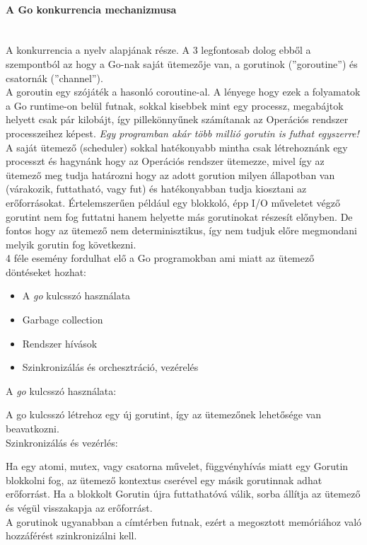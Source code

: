 \paragraph{A Go konkurrencia mechanizmusa} \mbox{} \\
A konkurrencia a nyelv alapjának része. A 3 legfontosab dolog ebből a szempontból az hogy a Go-nak saját ütemezője van,
a gorutinok (''goroutine'') és csatornák (''channel'').\\
A goroutin egy szójáték a hasonló coroutine-al. A lényege hogy ezek a folyamatok a Go runtime-on belül futnak, sokkal kisebbek mint egy processz, megabájtok helyett csak pár kilobájt,
így pillekönnyűnek számítanak az Operációs rendszer processzeihez képest. \emph{Egy programban akár több millió gorutin is futhat egyszerre!}
A saját ütemező (scheduler) sokkal hatékonyabb mintha csak létrehoznánk egy processzt és hagynánk hogy az Operációs rendszer ütemezze,
mivel így az ütemező meg tudja határozni hogy az adott gorution milyen állapotban van (várakozik, futtatható, vagy fut) és hatékonyabban tudja
kiosztani az erőforrásokat. Értelemszerűen például egy blokkoló, épp I/O műveletet végző gorutint nem fog futtatni hanem helyette más gorutinokat részesít
előnyben. De fontos hogy az ütemező nem determinisztikus, így nem tudjuk előre megmondani melyik gorutin fog következni.\\
4 féle esemény fordulhat elő a Go programokban ami miatt az ütemező döntéseket hozhat:
\begin{itemize}
    \item A \emph{go} kulcsszó használata
    \item Garbage collection
    \item Rendszer hívások
    \item Szinkronizálás és orchesztráció, vezérelés
\end{itemize}
A \emph{go} kulcsszó használata: \par
A go kulcsszó létrehoz egy új gorutint, így az ütemezőnek lehetősége van beavatkozni.\\
Szinkronizálás és vezérlés: \par
Ha egy atomi, mutex, vagy csatorna művelet, függvényhívás miatt egy Gorutin blokkolni fog, az ütemező kontextus cserével egy másik gorutinnak adhat erőforrást. Ha a blokkolt Gorutin újra futtathatóvá válik, sorba állítja az ütemező és végül visszakapja az erőforrást.\\
A gorutinok ugyanabban a címtérben futnak, ezért a megosztott memóriához való hozzáférést szinkronizálni kell.

